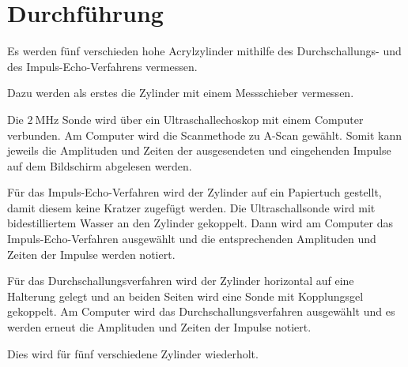 \section{Durchführung}
\label{sec:Durchführung}


Es werden fünf verschieden hohe Acrylzylinder mithilfe des Durchschallungs- und des Impuls-Echo-Verfahrens vermessen.

Dazu werden als erstes die Zylinder mit einem Messschieber vermessen. 

Die $\SI{2}{\mega\hertz}$ Sonde wird über ein Ultraschallechoskop mit einem Computer verbunden.
Am Computer wird die Scanmethode zu A-Scan gewählt.
Somit kann jeweils die Amplituden und Zeiten der ausgesendeten und eingehenden Impulse auf dem Bildschirm abgelesen werden.

Für das Impuls-Echo-Verfahren wird der Zylinder auf ein Papiertuch gestellt, damit diesem keine Kratzer zugefügt werden.
Die Ultraschallsonde wird mit bidestilliertem Wasser an den Zylinder gekoppelt.
Dann wird am Computer das Impuls-Echo-Verfahren ausgewählt und die entsprechenden Amplituden und Zeiten der Impulse werden notiert.

Für das Durchschallungsverfahren wird der Zylinder horizontal auf eine Halterung gelegt und an beiden Seiten wird eine Sonde mit Kopplungsgel gekoppelt.
Am Computer wird das Durchschallungsverfahren ausgewählt und es werden erneut die Amplituden und Zeiten der Impulse notiert.

Dies wird für fünf verschiedene Zylinder wiederholt.
